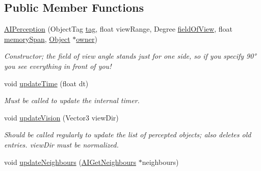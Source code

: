 \subsection*{\-Public \-Member \-Functions}
\begin{DoxyCompactItemize}
\item 
\hypertarget{classAIPerception_ab92fd77d63f3e33a0712d71f25716091}{
\hyperlink{classAIPerception_ab92fd77d63f3e33a0712d71f25716091}{\-A\-I\-Perception} (\-Object\-Tag \hyperlink{classAIPerception_a03846948a5a7d9ea6043b67b28172e78}{tag}, float view\-Range, \-Degree \hyperlink{classAIPerception_a58033209cd3ef65646a7e3296b5f7530}{field\-Of\-View}, float \hyperlink{classAIPerception_a465a687df63900dab25613b7dceba964}{memory\-Span}, \hyperlink{classObject}{\-Object} $\ast$\hyperlink{classAIPerception_a081f61b494e193c528b6fb9562c1d050}{owner})}
\label{d4/d0b/classAIPerception_ab92fd77d63f3e33a0712d71f25716091}

\begin{DoxyCompactList}\small\item\em \-Constructor; the field of view angle stands just for one side, so if you specify 90° you see everything in front of you! \end{DoxyCompactList}\item 
\hypertarget{classAIPerception_ad227e639363dc91a20e8a98f3d39b29d}{
void \hyperlink{classAIPerception_ad227e639363dc91a20e8a98f3d39b29d}{update\-Time} (float dt)}
\label{d4/d0b/classAIPerception_ad227e639363dc91a20e8a98f3d39b29d}

\begin{DoxyCompactList}\small\item\em \-Must be called to update the internal timer. \end{DoxyCompactList}\item 
\hypertarget{classAIPerception_a7adc400461ee9d1101b08b291e6aeead}{
void \hyperlink{classAIPerception_a7adc400461ee9d1101b08b291e6aeead}{update\-Vision} (\-Vector3 view\-Dir)}
\label{d4/d0b/classAIPerception_a7adc400461ee9d1101b08b291e6aeead}

\begin{DoxyCompactList}\small\item\em \-Should be called regularly to update the list of percepted objects; also deletes old entries. view\-Dir must be normalized. \end{DoxyCompactList}\item 
\hypertarget{classAIPerception_a2025c6cac04e67f41deb91074c2505c2}{
void \hyperlink{classAIPerception_a2025c6cac04e67f41deb91074c2505c2}{update\-Neighbours} (\hyperlink{classAIGetNeighbours}{\-A\-I\-Get\-Neighbours} $\ast$neighbours)}
\label{d4/d0b/classAIPerception_a2025c6cac04e67f41deb91074c2505c2}


\end{DoxyCompactItemize}
